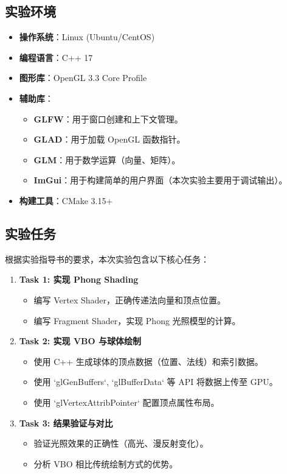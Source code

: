 \documentclass[a4paper]{article}
\begin{document}
\subsection{实验环境}
\begin{itemize}
    \item \textbf{操作系统}：Linux (Ubuntu/CentOS)
    \item \textbf{编程语言}：C++ 17
    \item \textbf{图形库}：OpenGL 3.3 Core Profile
    \item \textbf{辅助库}：
    \begin{itemize}
        \item \textbf{GLFW}：用于窗口创建和上下文管理。
        \item \textbf{GLAD}：用于加载 OpenGL 函数指针。
        \item \textbf{GLM}：用于数学运算（向量、矩阵）。
        \item \textbf{ImGui}：用于构建简单的用户界面（本次实验主要用于调试输出）。
    \end{itemize}
    \item \textbf{构建工具}：CMake 3.15+
\end{itemize}

\subsection{实验任务}
根据实验指导书的要求，本次实验包含以下核心任务：
\begin{enumerate}
    \item \textbf{Task 1: 实现 Phong Shading}
    \begin{itemize}
        \item 编写 Vertex Shader，正确传递法向量和顶点位置。
        \item 编写 Fragment Shader，实现 Phong 光照模型的计算。
    \end{itemize}
    \item \textbf{Task 2: 实现 VBO 与球体绘制}
    \begin{itemize}
        \item 使用 C++ 生成球体的顶点数据（位置、法线）和索引数据。
        \item 使用 `glGenBuffers`, `glBufferData` 等 API 将数据上传至 GPU。
        \item 使用 `glVertexAttribPointer` 配置顶点属性布局。
    \end{itemize}
    \item \textbf{Task 3: 结果验证与对比}
    \begin{itemize}
        \item 验证光照效果的正确性（高光、漫反射变化）。
        \item 分析 VBO 相比传统绘制方式的优势。
    \end{itemize}
\end{enumerate}
\end{document}

